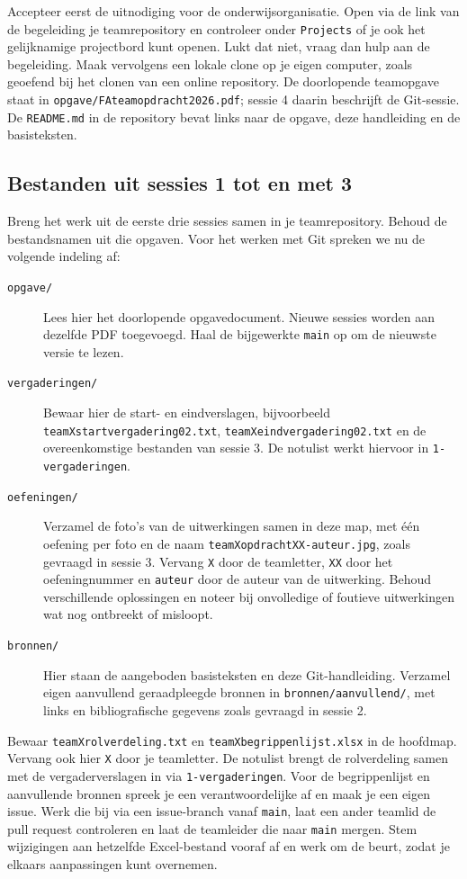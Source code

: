 \documentclass[kulak]{kulakarticle} %
\begin{document}
Accepteer eerst de uitnodiging voor de onderwijsorganisatie. Open via de
link van de begeleiding je teamrepository en controleer onder
\texttt{Projects} of je ook het gelijknamige projectbord kunt openen.
Lukt dat niet, vraag dan hulp aan de begeleiding. Maak vervolgens een
lokale clone op je eigen computer, zoals geoefend bij het clonen van een
online repository. De doorlopende teamopgave staat in
\texttt{opgave/FAteamopdracht2026.pdf}; sessie 4 daarin beschrijft de
Git-sessie. De \texttt{README.md} in de repository bevat links naar de
opgave, deze handleiding en de basisteksten.

\subsection{Bestanden uit sessies 1 tot en met 3}
\label{ssec:teammappen}

Breng het werk uit de eerste drie sessies samen in je teamrepository.
Behoud de bestandsnamen uit die opgaven. Voor het werken met Git spreken
we nu de volgende indeling af:
\begin{description}
    \item[\texttt{opgave/}] Lees hier het doorlopende opgavedocument.
    Nieuwe sessies worden aan dezelfde PDF toegevoegd. Haal de bijgewerkte
    \texttt{main} op om de nieuwste versie te lezen.
    \item[\texttt{vergaderingen/}] Bewaar hier de start- en eindverslagen,
    bijvoorbeeld \texttt{teamXstartvergadering02.txt},
    \texttt{teamXeindvergadering02.txt} en de overeenkomstige bestanden
    van sessie 3. De notulist werkt hiervoor in \texttt{1-vergaderingen}.
    \item[\texttt{oefeningen/}] Verzamel de foto's van de uitwerkingen
    samen in deze map, met één oefening per foto en de naam
    \texttt{teamXopdrachtXX-auteur.jpg}, zoals gevraagd in sessie 3.
    Vervang \texttt{X} door de teamletter, \texttt{XX} door het
    oefeningnummer en \texttt{auteur} door de auteur van de uitwerking.
    Behoud verschillende oplossingen en noteer bij onvolledige of
    foutieve uitwerkingen wat nog ontbreekt of misloopt.
    \item[\texttt{bronnen/}] Hier staan de aangeboden basisteksten en
    deze Git-handleiding. Verzamel eigen aanvullend geraadpleegde bronnen
    in \texttt{bronnen/aanvullend/}, met links en bibliografische gegevens
    zoals gevraagd in sessie 2.
\end{description}

Bewaar \texttt{teamXrolverdeling.txt} en \texttt{teamXbegrippenlijst.xlsx}
in de hoofdmap. Vervang ook hier \texttt{X} door je teamletter.
De notulist brengt de rolverdeling samen met de vergaderverslagen in via
\texttt{1-vergaderingen}. Voor de begrippenlijst en aanvullende bronnen
spreek je een verantwoordelijke af en maak je een eigen issue. Werk die
bij via een issue-branch vanaf \texttt{main}, laat een ander teamlid de
pull request controleren en laat de teamleider die naar \texttt{main} mergen.
Stem wijzigingen aan hetzelfde Excel-bestand vooraf af en werk om de
beurt, zodat je elkaars aanpassingen kunt overnemen.
\end{document}
